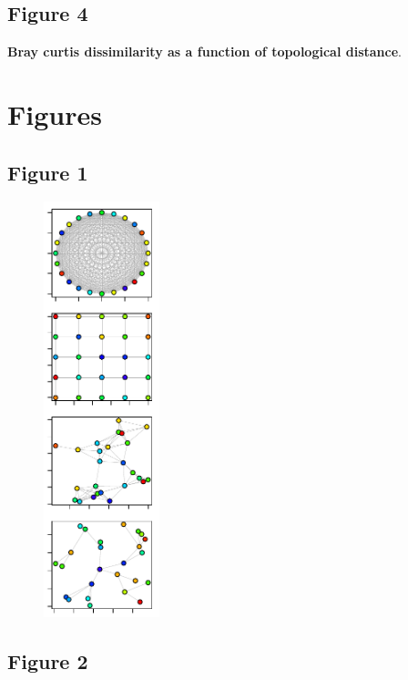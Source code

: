 \documentclass[12pt]{article}
\begin{document}
\subsection*{Figure 4}
\textbf{Bray curtis dissimilarity as a function of topological distance}. 

\newpage

\section*{Figures}

\subsection*{Figure 1}

\begin{figure}[ht!]
\centering\includegraphics[width=0.3\textwidth]{Networks.pdf}
\end{figure}

\newpage

\subsection*{Figure 2}
\end{document}

